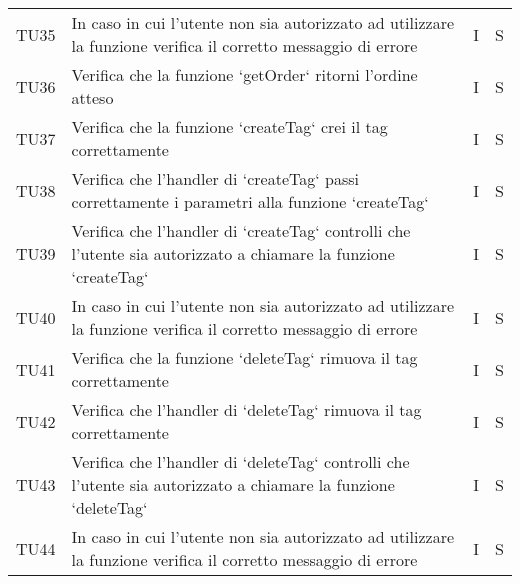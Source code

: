 \begin{center}
\begin{longtable}[!h]{p{45px} p{255px} p{35px} p{35px}}
        TU35 & In caso in cui l'utente non sia autorizzato ad utilizzare la funzione verifica il corretto messaggio di errore & I & S \\
        TU36          & Verifica che la funzione `getOrder` ritorni l'ordine atteso                                                                                                                                      & I              & S              \\
        TU37          & Verifica che la funzione `createTag` crei il tag correttamente                                                                                                                                   & I              & S              \\
        TU38          & Verifica che l'handler di `createTag` passi correttamente i parametri alla funzione `createTag`                                                                                                  & I              & S              \\
        TU39          & Verifica che l'handler di `createTag` controlli che l'utente sia autorizzato a chiamare la funzione `createTag`                                                                                  & I              & S              \\
        TU40 & In caso in cui l'utente non sia autorizzato ad utilizzare la funzione verifica il corretto messaggio di errore & I & S \\

        TU41          & Verifica che la funzione `deleteTag` rimuova il tag correttamente                                                                                                                                & I              & S              \\
        TU42          & Verifica che l'handler di `deleteTag` rimuova il tag correttamente                                                                                                                                  & I & S \\
        TU43          & Verifica che l'handler di `deleteTag` controlli che l'utente sia autorizzato a chiamare la funzione `deleteTag`                                                                                  & I              & S              \\
        TU44 & In caso in cui l'utente non sia autorizzato ad utilizzare la funzione verifica il corretto messaggio di errore & I & S \\
                                                                                                                                                                                                                     

\end{longtable}
\end{center}
